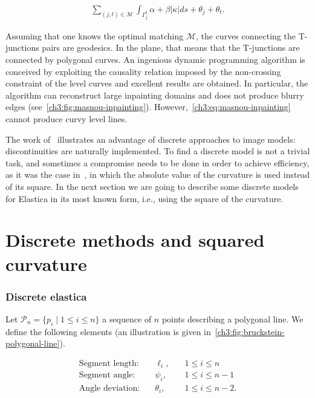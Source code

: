 \begin{align}
	\sum_{(j,t) \in \mathcal{M}}{ \int_{\Gamma_j^t}{\alpha + \beta |\kappa|ds} + \theta_j + \theta_t }.
	\label{ch3:eq:masnou-inpainting}
\end{align}


Assuming that one knows the optimal matching $\mathcal{M}$, the curves connecting the T-junctions pairs are geodesics. In the plane, that means that the T-junctions are connected by polygonal curves. An ingenious dynamic programming algorithm is conceived  by exploiting the causality relation imposed by the non-crossing constraint of the level curves and excellent results are obtained. In particular, the algorithm can reconstruct large inpainting domains and does not produce blurry edges (see~\cref{ch3:fig:masnou-inpainting}). However,~\cref{ch3:eq:masnou-inpainting} cannot produce curvy level lines.


The work of~\cite{masnou98inpainting} illustrates an advantage of discrete approaches to image models: discontinuities are naturally implemented. To find a discrete model is not a trivial task, and sometimes a compromise needs to be done in order to achieve efficiency, as it was the case in~\cite{masnou98inpainting}, in which the absolute value of the curvature is used instead of its square. In the next section we are going to describe some discrete models for Elastica in its most known form, i.e., using the square of the curvature.


\section{Discrete methods and squared curvature}
\label{ch3:sec:discrete-methods-squared-curvature}

\subsubsection{Discrete elastica}

Let $\mathcal{P}_n=\{p_i \; | \; 1 \leq i \leq n\}$ a sequence of $n$ points describing a polygonal line. We define the following elements (an illustration is given in~\cref{ch3:fig:bruckstein-polygonal-line}).

\[
\begin{array}{rll}
\text{Segment length:} & \quad \ell_i,& \quad 1 \leq i \leq n\\[0.5em]
\text{Segment angle:} & \quad \psi_i,& \quad 1 \leq i \leq n-1\\[0.5em]
\text{Angle deviation:} & \quad \theta_i,& \quad 1 \leq i \leq n-2.
\end{array}
\]

